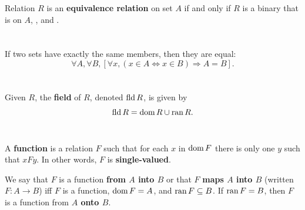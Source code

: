 \documentclass{report}
\begin{document}
Relation $R$ is an \textbf{equivalence relation} on set $A$ if and only if
  $R$ is a binary  that is  on $A$,
  , and .

\begin{definition}


\end{definition}

\section{}%
\label{ref:extensionality-axiom}

If two sets have exactly the same members, then they are equal:
  $$\forall A, \forall B,
      \left[\forall x, (x \in A \iff x \in B) \Rightarrow A = B\right].$$

\begin{axiom}


\end{axiom}

\section{}%
\label{ref:field}

Given  $R$, the \textbf{field} of $R$, denoted $\mathop{\text{fld}}{R}$,
  is given by $$\mathop{\text{fld}}{R} = \mathop{\text{dom}}{R} \cup \mathop{\text{ran}}{R}.$$

\begin{definition}


\end{definition}

\section{}%
\label{ref:function}

A \textbf{function} is a relation $F$ such that for each $x$ in $\mathop{\text{dom}}{F}$ there
  is only one $y$ such that $xFy$.
In other words, $F$ is \textbf{single-valued}.

We say that $F$ is a function \textbf{from $A$ into $B$} or that $F$
  \textbf{maps $A$ into $B$} (written $F \colon A \rightarrow B$) iff $F$ is a
  function, $\mathop{\text{dom}}{F} = A$, and $\mathop{\text{ran}}{F} \subseteq B$.
If $\mathop{\text{ran}}{F} = B$, then $F$ is a function from \textbf{$A$ onto $B$}.
\end{document}
